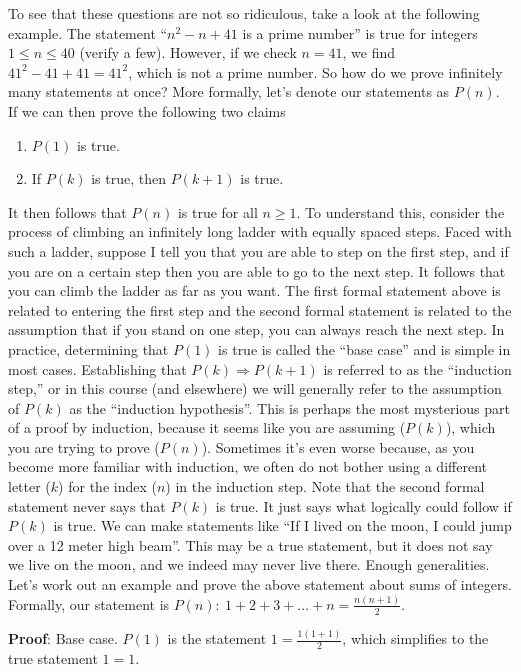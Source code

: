 %
To see that these questions are not so ridiculous, take a look at the following example. The statement ``$n^{2}-n+41$ is a prime number'' is true for integers $1\leq n\leq 40$ (verify a few). However, if we check $n=41$, we find $41^2-41+41=41^2$, which is not a prime number.
%
So how do we prove infinitely many statements at once? More formally, let's denote our statements as $P(n)$. If we can then prove the following two claims
%
\begin{enumerate}
\item $P(1)$ is true.
\item If $P(k)$ is true, then $P(k+1)$ is true.
\end{enumerate}
%
It then follows that $P(n)$ is true for all $n\geq 1$. To understand this, consider the process of climbing an infinitely long ladder with equally spaced steps. Faced with such a ladder, suppose I tell you that you are able to step on the first step, and if you are on a certain step then you are able to go to the next step. It follows that you can climb the ladder as far as you want. The first formal statement above is related to entering the first step and the second formal statement is related to the assumption that if you stand on one step, you can always reach the next step.
%
In practice, determining that $P(1)$ is true is called the ``base case'' and is simple in most cases. Establishing that $P(k)\Rightarrow P(k+1)$ is referred to as the ``induction step,'' or in this course (and elsewhere) we will generally refer to the assumption of $P(k)$ as the ``induction hypothesis''. This is perhaps the most mysterious part of a proof by induction, because it seems like you are assuming ($P(k)$), which you are trying to prove ($P(n)$). Sometimes it's even worse because, as you become more familiar with induction, we often do not bother using a different letter ($k$) for the index ($n$) in the induction step. Note that the second formal statement never says that $P(k)$ is true. It just says what logically could follow if $P(k)$ is true. We can make statements like ``If I lived on the moon, I could jump over a 12 meter high beam''. This may be a true statement, but it does not say we live on the moon, and we indeed may never live there.
%
Enough generalities. Let's work out an example and prove the above statement about sums of integers. Formally, our statement is 
$P(n):\ 1+2+3+\dots+n=\frac{n(n+1)}{2}$.

%
{\bf Proof}:  Base case.  $P(1)$ is the statement $1=\frac{1(1+1)}{2}$, which simplifies to the true statement $1=1$.
%

